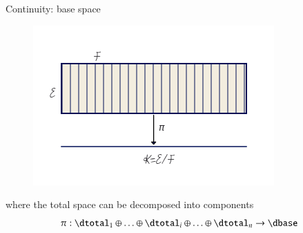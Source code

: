 \documentclass[xcolor={dvipsnames}, handout]{beamer}
\begin{document}
\begin{frame}{Continuity: base space}
    \begin{figure}[H]
    \includegraphics[width=\linewidth]{figures/math/k_qspace.png}
    \caption{}
    \label{fig:base_space_div}
\end{figure}
where the total space can be decomposed into components 
\begin{equation}
    \pi:\dtotal_1\oplus\ldots\oplus \dtotal_i \oplus\ldots \oplus \dtotal_n \rightarrow \dbase
\end{equation}
\end{frame}
\end{document}
